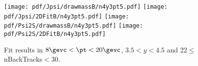 \begin{figure}[H]
\begin{center}
\texttt{[image: pdf/Jpsi/drawmassB/n4y3pt5.pdf]}
\texttt{[image: pdf/Jpsi/2DFitB/n4y3pt5.pdf]}
\vspace*{-0.5cm}
\texttt{[image: pdf/Psi2S/drawmassB/n4y3pt5.pdf]}
\texttt{[image: pdf/Psi2S/2DFitB/n4y3pt5.pdf]}
\vspace*{-0.5cm}
\end{center}
\caption{Fit results in $8\gevc<\pt<20\gevc$, $3.5<y<4.5$ and 22$\leq$nBackTracks$<$30.}
\label{Fitn4y3pt5}
\end{figure}
